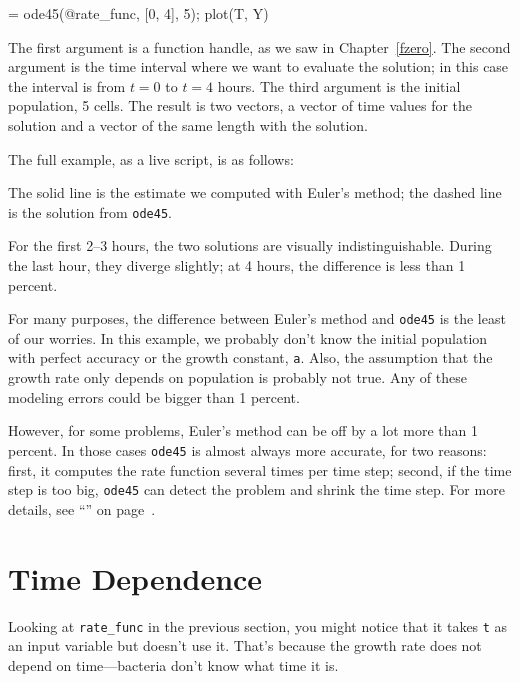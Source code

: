\documentclass[../../book.tex]{subfiles}
\begin{document}
\begin{code}
[T, Y] = ode45(@rate_func, [0, 4], 5);
plot(T, Y)
\end{code}

The first argument is a function handle, as we saw in Chapter~\ref{fzero}.  The second argument is the time interval where we want to evaluate the solution; in this case the interval is from $t=0$ to $t=4$ hours.  The third argument is the initial population, 5 cells.  The result is two vectors, a vector of time values for the solution and a vector of the same length with the solution.


The full example, as a live script, is as follows:


The solid line is the estimate we computed with Euler's method; the dashed line is the solution from \lstinline{ode45}.

For the first 2--3 hours, the two solutions are visually indistinguishable.  During the last hour, they diverge slightly; at 4 hours, the difference is less than 1 percent.

For many purposes, the difference between Euler's method and \lstinline{ode45} is the least of our worries.  In this example, we probably don't know the initial population with perfect accuracy or the growth constant, \lstinline{a}.  Also, the assumption that the growth rate only depends on population is probably not true.  Any of these modeling errors could be bigger than 1 percent.

However, for some problems, Euler's method can be off by a lot more than 1 percent.
In those cases \lstinline{ode45} is almost always more accurate, for two reasons: first, it computes the rate function several times per time step; second, if the time step is too big, \lstinline{ode45} can detect the problem and shrink the time step.  For more details, see ``'' on page~\pageref{s:howode45}.


\section{Time Dependence}

Looking at \lstinline{rate_func} in the previous section, you might notice that it takes \lstinline{t} as an input variable but doesn't use it.  That's because the growth rate does not depend on time---bacteria don't know what time it is.
\end{document}
